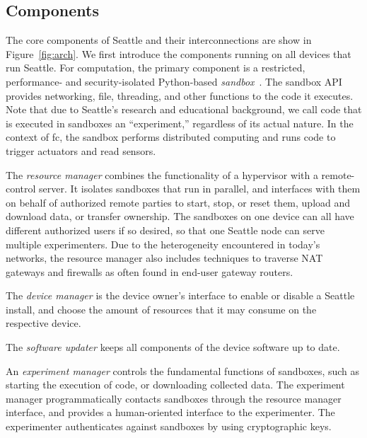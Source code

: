 \subsection{Components}\label{sec-components}

The core components of Seattle and their interconnections are
show in Figure~\ref{fig:arch}.
We first introduce the components running on all devices that
run Seattle.
For computation, the primary component is a restricted,
performance- and security-isolated Python-based
\textit{sandbox}~\cite{RepySandbox,li2015fence}.
The sandbox \gls{API} provides
networking, file, threading, and other functions to
the code it executes. Note that
due to Seattle's research and educational background, we
call code that is executed in sandboxes an ``experiment,''
regardless of its actual nature.
In the context of \gls{fc}, the sandbox performs distributed
computing and runs code to trigger actuators and read sensors.

The \textit{resource manager} combines the functionality of
a hypervisor with a remote-control server.
It isolates %
sandboxes that run in
parallel, and interfaces with them on behalf of authorized remote
parties to start, stop, or reset them, upload and download data,
or transfer ownership. The sandboxes on one
device can all have different authorized users if so desired,
so that one Seattle node can serve multiple experimenters.
Due to the heterogeneity encountered in today's networks,
the resource manager also includes techniques to traverse
\gls{NAT} gateways and firewalls as often found in end-user
gateway routers.

The \textit{device manager} %
is the device owner's interface to enable or disable a Seattle
install, and choose the amount of resources that it may consume on the respective
device.

The \textit{software updater} keeps all components of the
device software up to date.

An \textit{experiment manager} controls the fundamental functions of sandboxes, such as
starting the execution of code, or downloading collected data.
The experiment manager programmatically contacts sandboxes
through the resource manager interface, and provides a
human-oriented interface to the experimenter. The experimenter
authenticates against sandboxes by using cryptographic keys.

